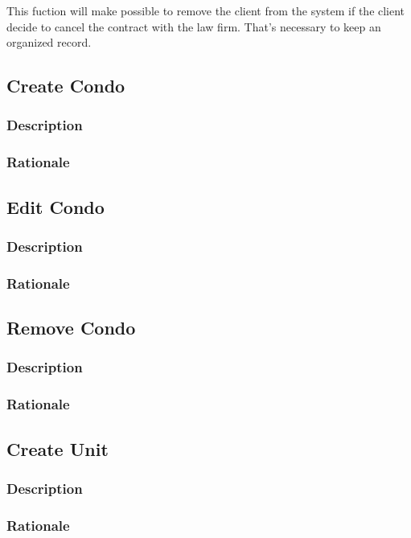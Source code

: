 \documentclass{scrreprt}
\begin{document}
This fuction will make possible to remove the client from the system if the client decide to cancel the contract with the law firm. That's necessary to keep an organized record.

\subsection{Create Condo}
\subsubsection{Description}

\subsubsection{Rationale}

\subsection{Edit Condo}
\subsubsection{Description}

\subsubsection{Rationale}

\subsection{Remove Condo}
\subsubsection{Description}

\subsubsection{Rationale}

\subsection{Create Unit}
\subsubsection{Description}

\subsubsection{Rationale}
\end{document}
